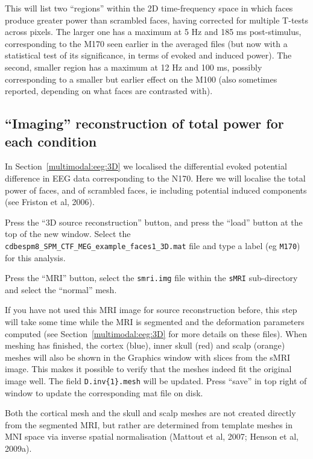 This will list two ``regions'' within the 2D time-frequency space in which faces produce greater power than scrambled faces, having corrected for multiple T-tests across pixels. The larger one has a maximum at 5 Hz and 185 ms post-stimulus, corresponding to the M170 seen earlier in the averaged files (but now with a statistical test of its significance, in terms of evoked and induced power). The second, smaller region has a maximum at 12 Hz and 100 ms, possibly corresponding to a smaller but earlier effect on the M100 (also sometimes reported, depending on what faces are contrasted with).

\subsection{``Imaging'' reconstruction of total power for each condition \label{multimodal:data:meg:recon_pow}}

In Section~\ref{multimodal:eeg:3D} we localised the differential evoked potential difference in EEG data corresponding to the N170.  Here we will localise the total power of faces, and of scrambled faces, ie including potential induced components (see Friston et al, 2006).

Press the ``3D source reconstruction'' button, and press the ``load'' button at the top of the new window. Select the \texttt{cdbespm8\_SPM\_CTF\_MEG\_example\_faces1\_3D.mat} file and type a label (eg \texttt{M170}) for this analysis.

Press the ``MRI'' button, select the \texttt{smri.img} file within the \texttt{sMRI} sub-directory and select the ``normal'' mesh.

If you have not used this MRI image for source reconstruction before, this step will take some time while the MRI is segmented and the deformation parameters computed (see Section~\ref{multimodal:eeg:3D} for more details on these files). When meshing has finished, the cortex (blue), inner skull (red) and scalp (orange) meshes will also be shown in the Graphics window with slices from the sMRI image. This makes it possible to verify that the meshes indeed fit the original image well. The field \texttt{D.inv\{1\}.mesh} will be updated. Press ``save'' in top right of window to update the corresponding mat file on disk.

Both the cortical mesh and the skull and scalp meshes are not created directly from the segmented MRI, but rather are determined from template meshes in MNI space via inverse spatial normalisation (Mattout et al, 2007; Henson et al, 2009a).

